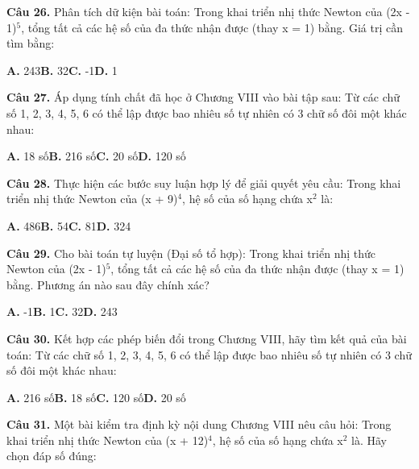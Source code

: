 \documentclass[11pt,a4paper]{article}
\begin{document}
\textbf{\color{primary} Câu 26.} Phân tích dữ kiện bài toán: Trong khai triển nhị thức Newton của (2x - 1)$^5$, tổng tất cả các hệ số của đa thức nhận được (thay x = 1) bằng. Giá trị cần tìm bằng:\par
\hspace*{1.5em}\textbf{A.} 243\quad\quad \textbf{B.} 32\quad\quad \textbf{C.} -1\quad\quad \textbf{D.} 1\par\vspace{2pt}
\textbf{\color{primary} Câu 27.} Áp dụng tính chất đã học ở Chương VIII vào bài tập sau: Từ các chữ số 1, 2, 3, 4, 5, 6 có thể lập được bao nhiêu số tự nhiên có 3 chữ số đôi một khác nhau:\par
\hspace*{1.5em}\textbf{A.} 18 số\quad\quad \textbf{B.} 216 số\quad\quad \textbf{C.} 20 số\quad\quad \textbf{D.} 120 số\par\vspace{2pt}
\textbf{\color{primary} Câu 28.} Thực hiện các bước suy luận hợp lý để giải quyết yêu cầu: Trong khai triển nhị thức Newton của (x + 9)$^4$, hệ số của số hạng chứa x$^2$ là:\par
\hspace*{1.5em}\textbf{A.} 486\quad\quad \textbf{B.} 54\quad\quad \textbf{C.} 81\quad\quad \textbf{D.} 324\par\vspace{2pt}
\textbf{\color{primary} Câu 29.} Cho bài toán tự luyện (Đại số tổ hợp): Trong khai triển nhị thức Newton của (2x - 1)$^5$, tổng tất cả các hệ số của đa thức nhận được (thay x = 1) bằng. Phương án nào sau đây chính xác?\par
\hspace*{1.5em}\textbf{A.} -1\quad\quad \textbf{B.} 1\quad\quad \textbf{C.} 32\quad\quad \textbf{D.} 243\par\vspace{2pt}
\textbf{\color{primary} Câu 30.} Kết hợp các phép biến đổi trong Chương VIII, hãy tìm kết quả của bài toán: Từ các chữ số 1, 2, 3, 4, 5, 6 có thể lập được bao nhiêu số tự nhiên có 3 chữ số đôi một khác nhau:\par
\hspace*{1.5em}\textbf{A.} 216 số\quad\quad \textbf{B.} 18 số\quad\quad \textbf{C.} 120 số\quad\quad \textbf{D.} 20 số\par\vspace{2pt}
\textbf{\color{primary} Câu 31.} Một bài kiểm tra định kỳ nội dung Chương VIII nêu câu hỏi: Trong khai triển nhị thức Newton của (x + 12)$^4$, hệ số của số hạng chứa x$^2$ là. Hãy chọn đáp số đúng:\par
\end{document}
